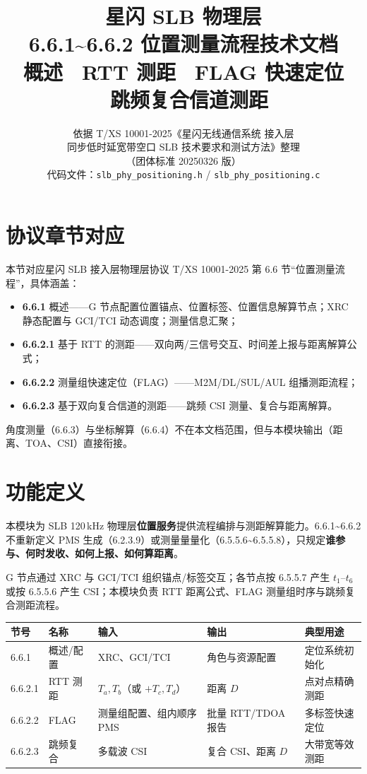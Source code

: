 \documentclass[11pt,a4paper]{ctexart}
\title{%
  \textbf{星闪 SLB 物理层}\\[0.4em]
  \Large 6.6.1\textasciitilde 6.6.2 位置测量流程技术文档\\[0.3em]
  \large 概述 \textbullet\ RTT 测距 \textbullet\ FLAG 快速定位 \textbullet\ 跳频复合信道测距
}
\author{依据 T/XS 10001-2025《星闪无线通信系统 接入层\\
同步低时延宽带空口 SLB 技术要求和测试方法》整理\\
（团体标准 20250326 版）\\[0.5em]
代码文件：\texttt{slb\_phy\_positioning.h} / \texttt{slb\_phy\_positioning.c}}
\date{}
\begin{document}
\maketitle
\tableofcontents
\newpage

\section{协议章节对应}

本节对应星闪 SLB 接入层物理层协议 T/XS 10001-2025 第 6.6 节``位置测量流程''，具体涵盖：
\begin{itemize}[nosep]
  \item \textbf{6.6.1} 概述——G 节点配置位置锚点、位置标签、位置信息解算节点；XRC 静态配置与 GCI/TCI 动态调度；测量信息汇聚；
  \item \textbf{6.6.2.1} 基于 RTT 的测距——双向两/三信号交互、时间差上报与距离解算公式；
  \item \textbf{6.6.2.2} 测量组快速定位（FLAG）——M2M/DL/SUL/AUL 组播测距流程；
  \item \textbf{6.6.2.3} 基于双向复合信道的测距——跳频 CSI 测量、复合与距离解算。
\end{itemize}

角度测量（6.6.3）与坐标解算（6.6.4）不在本文档范围，但与本模块输出（距离、TOA、CSI）直接衔接。

\section{功能定义}

本模块为 SLB 120\,kHz 物理层\textbf{位置服务}提供流程编排与测距解算能力。6.6.1\textasciitilde 6.6.2 不重新定义 PMS 生成（6.2.3.9）或测量量量化（6.5.5.6\textasciitilde 6.5.5.8），只规定\textbf{谁参与、何时发收、如何上报、如何算距离}。

G 节点通过 XRC 与 GCI/TCI 组织锚点/标签交互；各节点按 6.5.5.7 产生 $t_1$--$t_6$ 或按 6.5.5.6 产生 CSI；本模块负责 RTT 距离公式、FLAG 测量组时序与跳频复合测距流程。

\begin{table}[h]
\centering
\small
\begin{tabular}{lllll}
\toprule
\textbf{节号} & \textbf{名称} & \textbf{输入} & \textbf{输出} & \textbf{典型用途} \\
\midrule
6.6.1 & 概述/配置 & XRC、GCI/TCI & 角色与资源配置 & 定位系统初始化 \\
6.6.2.1 & RTT 测距 & $T_a,T_b$（或 $+T_c,T_d$） & 距离 $D$ & 点对点精确测距 \\
6.6.2.2 & FLAG & 测量组配置、组内顺序 PMS & 批量 RTT/TDOA 报告 & 多标签快速定位 \\
6.6.2.3 & 跳频复合 & 多载波 CSI & 复合 CSI、距离 $D$ & 大带宽等效测距 \\
\bottomrule
\end{tabular}
\end{table}
\end{document}
